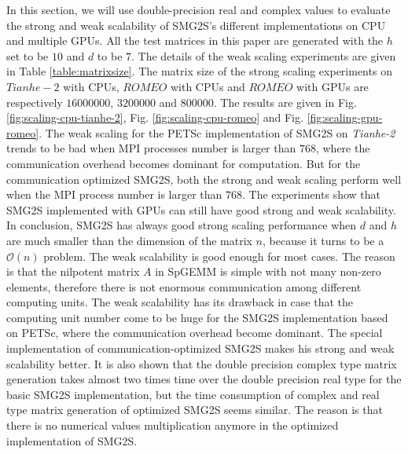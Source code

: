 In this section, we will use double-precision real and complex values to evaluate the strong and weak scalability of SMG2S's different implementations on CPU and multiple GPUs. All the test matrices in this paper are generated with the $h$ set to be $10$  and $d$ to be $7$. The details of the weak scaling experiments are given in Table \ref{table:matrixsize}. The matrix size of the strong scaling experiments on $Tianhe-2$ with CPUs, $ROMEO$ with CPUs and $ROMEO$ with GPUs are respectively $\num[round-precision=2,round-mode=figures]{16000000}$, $\num[round-precision=2,round-mode=figures]{3200000}$ and $\num[round-precision=2,round-mode=figures]{800000}$. The results are given in Fig. \ref{fig:scaling-cpu-tianhe-2}, Fig. \ref{fig:scaling-cpu-romeo} and Fig. \ref{fig:scaling-gpu-romeo}. The weak scaling for the PETSc implementation of SMG2S on \textit{Tianhe-2} trends to be bad when MPI processes number is larger than $768$, where the communication overhead becomes dominant for computation. But for the communication optimized SMG2S, both the strong and weak scaling perform well when the MPI process number is larger than $768$. The experiments show that SMG2S implemented with GPUs can still have good strong and weak scalability. In conclusion, SMG2S has always good strong scaling performance when $d$ and $h$ are much smaller than the dimension of the matrix $n$, because it turns to be a $\mathcal{O}(n)$ problem. The weak scalability is good enough for most cases. The reason is that the nilpotent matrix $A$ in SpGEMM is simple with not many non-zero elements, therefore there is not enormous communication among different computing units. The weak scalability has its drawback in case that the computing unit number come to be huge for the SMG2S implementation based on PETSc, where the communication overhead become dominant. The special implementation of communication-optimized SMG2S makes his strong and weak scalability better. It is also shown that the double precision complex type matrix generation takes almost two times time over the double precision real type for the basic SMG2S implementation, but the time consumption of complex and real type matrix generation of optimized SMG2S seems similar. The reason is that there is no numerical values multiplication anymore in the optimized implementation of SMG2S. 

